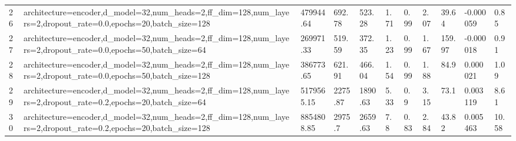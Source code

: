 \begin{longtable}{C{0.8cm} L{2cm} C{1.15cm} C{1.15cm} C{1.15cm} C{1.15cm} C{0.85cm} C{1.25cm} C{1.2cm} C{1.5cm} C{1.0cm}}
26 & architecture=encoder,\newline d\_model=32,\newline num\_heads=2,\newline ff\_dim=128,\newline num\_layers=2,\newline dropout\_rate=0.0,\newline epochs=20,\newline batch\_size=128 & 479944.64 & 692.78 & 523.28 & 1.71 & 0.99 & 2.07 & 39.64 & -0.000059 & 0.85 \\
27 & architecture=encoder,\newline d\_model=32,\newline num\_heads=2,\newline ff\_dim=128,\newline num\_layers=2,\newline dropout\_rate=0.0,\newline epochs=50,\newline batch\_size=64 & 269971.33 & 519.59 & 372.35 & 1.23 & 0.99 & 1.67 & 159.97 & -0.000018 & 0.91 \\
28 & architecture=encoder,\newline d\_model=32,\newline num\_heads=2,\newline ff\_dim=128,\newline num\_layers=2,\newline dropout\_rate=0.0,\newline epochs=50,\newline batch\_size=128 & 386773.65 & 621.91 & 466.04 & 1.54 & 0.99 & 1.88 & 84.9 & 0.000021 & 1.09 \\
29 & architecture=encoder,\newline d\_model=32,\newline num\_heads=2,\newline ff\_dim=128,\newline num\_layers=2,\newline dropout\_rate=0.2,\newline epochs=20,\newline batch\_size=64 & 5179565.15 & 2275.87 & 1890.63 & 5.33 & 0.9 & 3.15 & 73.1 & 0.003119 & 8.61 \\
30 & architecture=encoder,\newline d\_model=32,\newline num\_heads=2,\newline ff\_dim=128,\newline num\_layers=2,\newline dropout\_rate=0.2,\newline epochs=20,\newline batch\_size=128 & 8854808.85 & 2975.7 & 2659.63 & 7.8 & 0.83 & 2.84 & 43.82 & 0.005463 & 10.58 \\

\end{longtable}
